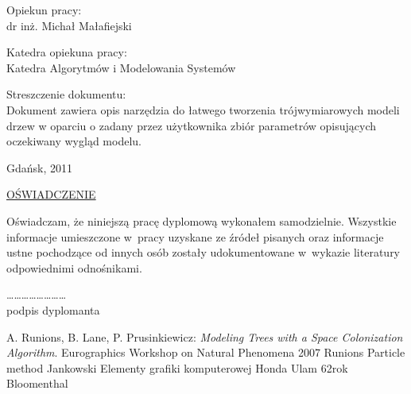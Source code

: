 \documentclass[a4paper,12pt]{report}
\begin{document}
\begin{par}
	Opiekun pracy: \\
	dr inż. Michał Małafiejski

	\vspace{5mm}

	Katedra opiekuna pracy: \\
	Katedra Algorytmów i Modelowania Systemów

	\vspace{15mm}

	Streszczenie dokumentu: \\
	Dokument zawiera opis narzędzia do łatwego tworzenia trójwymiarowych modeli
	drzew w oparciu o zadany przez użytkownika zbiór parametrów opisujących oczekiwany wygląd modelu.
\end{par}

\begin{par}
	\begin{center}
		Gdańsk, 2011
	\end{center}
\end{par}

\newpage
\begin{par}
	\begin{center}
		\large
		\underline{OŚWIADCZENIE}
	\end{center}
\end{par}

\begin{par}
	Oświadczam, że niniejszą pracę dyplomową wykonałem samodzielnie. Wszystkie
	informacje umieszczone w~pracy uzyskane ze źródeł pisanych oraz informacje ustne
	pochodzące od innych osób zostały udokumentowane w~wykazie literatury
	odpowiednimi odnośnikami.
\end{par}

\vspace{20mm}

\begin{par}
	\begin{flushright}
		\ldots\ldots\ldots\ldots\ldots\ldots\ldots\ldots \\
		podpis dyplomanta
	\end{flushright}
\end{par}

\tableofcontents















\begin{thebibliography}{1}
A. Runions, B. Lane, P. Prusinkiewicz: \emph{Modeling Trees with a Space Colonization Algorithm}.
Eurographics Workshop on Natural Phenomena 2007
 Runions Particle method
 Jankowski  Elementy grafiki komputerowej
 Honda
 Ulam 62rok
 Bloomenthal
\end{thebibliography}
\end{document}
